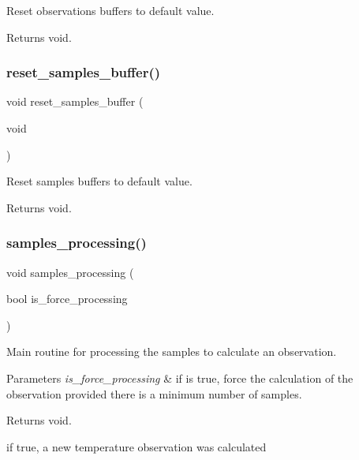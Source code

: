 Reset observations buffers to default value. 

\begin{DoxyReturn}{Returns}
void. 
\end{DoxyReturn}
\mbox{\label{i2c-th_8h_a5f6b7d25ff64c2ddaa0fadd3058fcee3}} 
\subsubsection{\texorpdfstring{reset\+\_\+samples\+\_\+buffer()}{reset\_samples\_buffer()}}
{\footnotesize\ttfamily void reset\+\_\+samples\+\_\+buffer (\begin{DoxyParamCaption}\item[{void}]{ }\end{DoxyParamCaption})}



Reset samples buffers to default value. 

\begin{DoxyReturn}{Returns}
void. 
\end{DoxyReturn}
\mbox{\label{i2c-th_8h_aba0fc91d6c2829df00a9d5fe2b921c90}} 
\subsubsection{\texorpdfstring{samples\+\_\+processing()}{samples\_processing()}}
{\footnotesize\ttfamily void samples\+\_\+processing (\begin{DoxyParamCaption}\item[{bool}]{is\+\_\+force\+\_\+processing }\end{DoxyParamCaption})}



Main routine for processing the samples to calculate an observation. 


\begin{DoxyParams}{Parameters}
{\em is\+\_\+force\+\_\+processing} & if is true, force the calculation of the observation provided there is a minimum number of samples. \\
\hline
\end{DoxyParams}
\begin{DoxyReturn}{Returns}
void. 
\end{DoxyReturn}
if true, a new temperature observation was calculated

